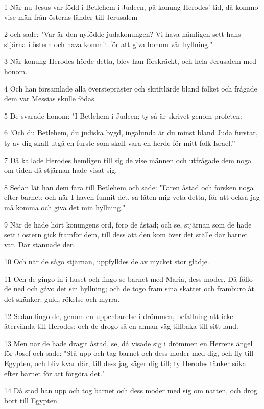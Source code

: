 \par 1 När nu Jesus var född i Betlehem i Judeen, på konung Herodes' tid, då kommo vise män från österns länder till Jerusalem
\par 2 och sade: "Var är den nyfödde judakonungen? Vi hava nämligen sett hans stjärna i östern och hava kommit för att giva honom vår hyllning."
\par 3 När konung Herodes hörde detta, blev han förskräckt, och hela Jerusalem med honom.
\par 4 Och han församlade alla överstepräster och skriftlärde bland folket och frågade dem var Messias skulle födas.
\par 5 De svarade honom: "I Betlehem i Judeen; ty så är skrivet genom profeten:
\par 6 'Och du Betlehem, du judiska bygd, ingalunda är du minst bland Juda furstar, ty av dig skall utgå en furste som skall vara en herde för mitt folk Israel.'"
\par 7 Då kallade Herodes hemligen till sig de vise männen och utfrågade dem noga om tiden då stjärnan hade visat sig.
\par 8 Sedan lät han dem fara till Betlehem och sade: "Faren åstad och forsken noga efter barnet; och när I haven funnit det, så låten mig veta detta, för att också jag må komma och giva det min hyllning."
\par 9 När de hade hört konungens ord, foro de åstad; och se, stjärnan som de hade sett i östern gick framför dem, till dess att den kom över det ställe där barnet var. Där stannade den.
\par 10 Och när de sågo stjärnan, uppfylldes de av mycket stor glädje.
\par 11 Och de gingo in i huset och fingo se barnet med Maria, dess moder. Då föllo de ned och gåvo det sin hyllning; och de togo fram sina skatter och framburo åt det skänker: guld, rökelse och myrra.
\par 12 Sedan fingo de, genom en uppenbarelse i drömmen, befallning att icke återvända till Herodes; och de drogo så en annan väg tillbaka till sitt land.
\par 13 Men när de hade dragit åstad, se, då visade sig i drömmen en Herrens ängel för Josef och sade: "Stå upp och tag barnet och dess moder med dig, och fly till Egypten, och bliv kvar där, till dess jag säger dig till; ty Herodes tänker söka efter barnet för att förgöra det."
\par 14 Då stod han upp och tog barnet och dess moder med sig om natten, och drog bort till Egypten.
